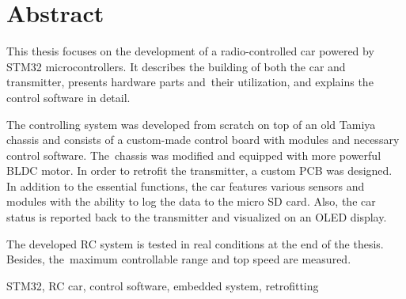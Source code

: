 \section*{Abstract}
\vspace{0.5cm}

This thesis focuses on the development of a radio-controlled car powered by STM32 microcontrollers. It describes the building of both the car and transmitter, presents hardware parts and~their utilization, and explains the control software in detail.

The controlling system was developed from scratch on top of an old Tamiya chassis and consists of a custom-made control board with modules and necessary control software. The~chassis was modified and equipped with more powerful BLDC motor. In order to retrofit the transmitter, a custom PCB was designed. In addition to the essential functions, the car features various sensors and modules with the ability to log the data to the micro SD card. Also, the car status is reported back to the transmitter and visualized on an OLED display.

The developed RC system is tested in real conditions at the end of the thesis. Besides, the~maximum controllable range and top speed are measured.

\vspace{1cm}
 STM32, RC car, control software, embedded system, retrofitting

